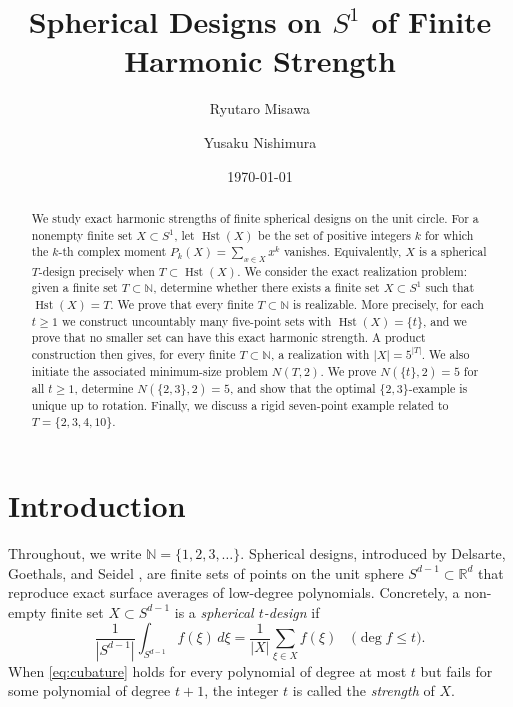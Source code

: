 \documentclass{amsart}
\title{Spherical Designs on $S^1$
 of Finite Harmonic Strength}
\author[R. Misawa]{Ryutaro Misawa}
\author[Y. Nishimura]{Yusaku Nishimura}
\date{\today}
\theoremstyle{definition}
\DeclareMathOperator{\Hst}{Hst}
\newcommand{\RR}{\mathbb{R}}
\newcommand{\NN}{\mathbb{N}}
\begin{document}
\begin{abstract}
We study exact harmonic strengths of finite spherical designs on the unit circle.  For a nonempty finite set \(X\subset S^1\), let \(\Hst(X)\) be the set of positive integers \(k\) for which the \(k\)-th complex moment \(P_k(X)=\sum_{x\in X}x^k\) vanishes.
Equivalently, \(X\) is a spherical \(T\)-design precisely when \(T\subset \Hst(X)\).  We consider the exact realization problem: given a finite set \(T\subset\mathbb N\), determine whether there exists a finite set \(X\subset S^1\) such that \(\Hst(X)=T\).
We prove that every finite \(T\subset\mathbb N\) is realizable. More precisely, for each \(t\ge 1\) we construct uncountably many five-point sets with \(\Hst(X)=\{t\}\), and we prove that no smaller set can have this exact harmonic strength.  A product construction then gives, for every finite \(T\subset\mathbb N\), a realization with
\(|X|=5^{|T|}\).  We also initiate the associated minimum-size problem \(N(T,2)\).  We prove \(N(\{t\},2)=5\) for all \(t\ge1\), determine
\(N(\{2,3\},2)=5\), and show that the optimal \(\{2,3\}\)-example is unique up to rotation.  Finally, we discuss a rigid seven-point example related to \(T=\{2,3,4,10\}\).

\end{abstract}



\maketitle

\section{Introduction}\label{sec:intro}

Throughout, we write \(\NN=\{1,2,3,\ldots\}\).
Spherical designs, introduced by Delsarte, Goethals, and Seidel \cite{DGS77},
are finite sets of points on the unit sphere \(S^{d-1}\subset\RR^d\) that
reproduce exact surface averages of low-degree polynomials.  Concretely, a
non-empty finite set \(X\subset S^{d-1}\) is a \emph{spherical \(t\)-design} if
\begin{equation}
   \label{eq:cubature}
  \frac{1}{|S^{d-1}|}\int_{S^{d-1}} f(\xi)\,d\xi
  =
  \frac{1}{|X|}\sum_{\xi\in X}f(\xi)
  \quad
  \bigl(\deg f\le t\bigr).
\end{equation}
When \eqref{eq:cubature} holds for every polynomial of degree at most \(t\)
but fails for some polynomial of degree \(t+1\), the integer \(t\) is called
the \emph{strength} of \(X\).
\end{document}

